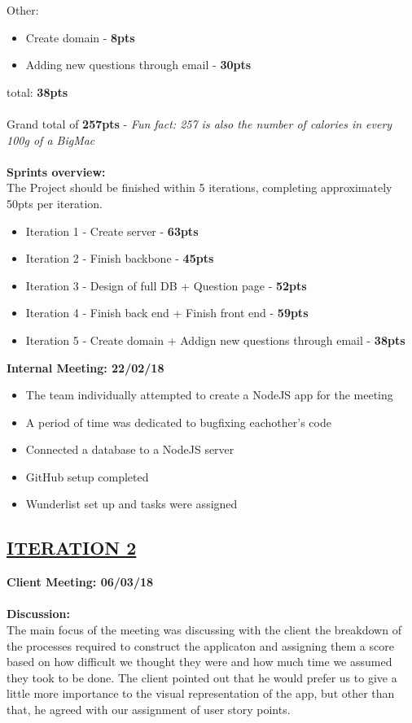 \documentclass[paper=a4,fontsize=11pt]{article}
\newcommand{\sepspace}{\vspace*{1em}}		%
\newcommand{\SectionPart}[1]{\subsection*{\uppercase{#1}}}
\begin{document}
\noindent
Other:
\begin{itemize}
	\item Create domain - \textbf{8pts}
	\item Adding new questions through email - \textbf{30pts}
\end{itemize} \hfill total: \textbf{38pts} \\\\

\noindent
Grand total of \textbf{257pts} - \textit{Fun fact: 257 is also the number of calories in every 100g of a BigMac}\\\\
\textbf{Sprints overview:}\\
The Project should be finished within 5 iterations, completing approximately 50pts per iteration.
\begin{itemize}
	\item Iteration 1 - Create server - \textbf{63pts}
	\item Iteration 2 - Finish backbone - \textbf{45pts}
	\item Iteration 3 - Design of full DB + Question page - \textbf{52pts}
	\item Iteration 4 - Finish back end + Finish front end - \textbf{59pts}
	\item Iteration 5 - Create domain + Addign new questions through email - \textbf{38pts}
\end{itemize}

\sepspace

\hfill \textbf{Internal Meeting: 22/02/18}

\begin{itemize}
	\item The team individually attempted to create a NodeJS app for the meeting
	\item A period of time was dedicated to bugfixing eachother's code
	\item Connected a database to a NodeJS server
	\item GitHub setup completed
	\item Wunderlist set up and tasks were assigned
\end{itemize}

\sepspace
\SectionPart{\ul{Iteration 2}}
\hfill \textbf{Client Meeting: 06/03/18} \\
\\
\textbf{Discussion:}\\
\noindent
The main focus of the meeting was discussing with the client the breakdown of
the processes required to construct the applicaton and assigning them a score based on how
difficult we thought they were and how much time we assumed they took to be done.
The client pointed out that he would prefer us to give a little more importance to the
visual representation of the app, but other than that, he agreed with our assignment of user story points.\\\\
\end{document}

